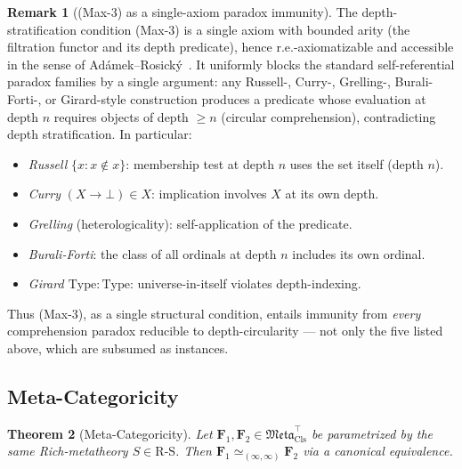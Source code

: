 \documentclass[11pt]{article}
\theoremstyle{plain}
\newtheorem{theorem}{Theorem}[section]
\theoremstyle{definition}
\newtheorem{remark}[theorem]{Remark}
\newcommand{\RS}{\mathrm{R\text{-}S}}
\newcommand{\Meta}{\mathfrak{Meta}}
\begin{document}
\begin{remark}[(Max-3) as a single-axiom paradox immunity]\label{rem:max3-paradox-immunity}
The depth-stratification condition (Max-3) is a single axiom with bounded arity (the filtration functor and its depth predicate), hence r.e.-axiomatizable and accessible in the sense of Ad\'amek--Rosick\'y~\cite{AdamekRosicky1994}. It uniformly blocks the standard self-referential paradox families by a single argument: any Russell-, Curry-, Grelling-, Burali-Forti-, or Girard-style construction produces a predicate whose evaluation at depth $n$ requires objects of depth $\geq n$ (circular comprehension), contradicting depth stratification. In particular:
\begin{itemize}
\item \emph{Russell} $\{x : x \notin x\}$: membership test at depth $n$ uses the set itself (depth $n$).
\item \emph{Curry} $(X \to \bot) \in X$: implication involves $X$ at its own depth.
\item \emph{Grelling} (heterologicality): self-application of the predicate.
\item \emph{Burali-Forti}: the class of all ordinals at depth $n$ includes its own ordinal.
\item \emph{Girard $\mathrm{Type} : \mathrm{Type}$}: universe-in-itself violates depth-indexing.
\end{itemize}
Thus (Max-3), as a single structural condition, entails immunity from \emph{every} comprehension paradox reducible to depth-circularity --- not only the five listed above, which are subsumed as instances.
\end{remark}

\subsection{Meta-Categoricity}

\begin{theorem}[Meta-Categoricity]\label{thm:meta-cat}
Let $\mathbf{F}_1, \mathbf{F}_2 \in \Meta_{\mathrm{Cls}}^{\top}$ be parametrized by the same Rich-metatheory $S \in \RS$. Then $\mathbf{F}_1 \simeq_{(\infty, \infty)} \mathbf{F}_2$ via a canonical equivalence.
\end{theorem}
\end{document}
